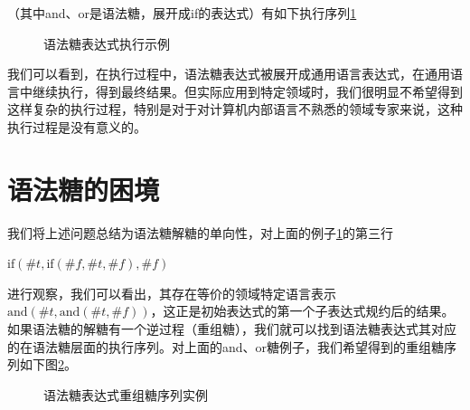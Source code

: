 （其中and、or是语法糖，展开成if的表达式）有如下执行序列\ref{fig:desugar}

\begin{figure}[ht]
\caption{语法糖表达式执行示例}
\label{fig:desugar}
\end{figure}



我们可以看到，在执行过程中，语法糖表达式被展开成通用语言表达式，在通用语言中继续执行，得到最终结果。但实际应用到特定领域时，我们很明显不希望得到这样复杂的执行过程，特别是对于对计算机内部语言不熟悉的领域专家来说，这种执行过程是没有意义的。


\section{语法糖的困境}
\label{mark:onedirect}我们将上述问题总结为语法糖解糖的单向性，对上面的例子\ref{fig:desugar}的第三行

\begin{flushleft}
	$\mbox{if}(\#t , \mbox{if}(\#f, \#t, \#f), \#f)$
\end{flushleft}
进行观察，我们可以看出，其存在等价的领域特定语言表示$\mbox{and}(\#t, \mbox{and}(\#t, \#f))$，这正是初始表达式的第一个子表达式规约后的结果。如果语法糖的解糖有一个逆过程（重组糖），我们就可以找到语法糖表达式其对应的在语法糖层面的执行序列。对上面的and、or糖例子，我们希望得到的重组糖序列如下图\ref{fig:resugar}。

\begin{figure}[ht]
	\caption{语法糖表达式重组糖序列实例}
	\label{fig:resugar}
\end{figure}

